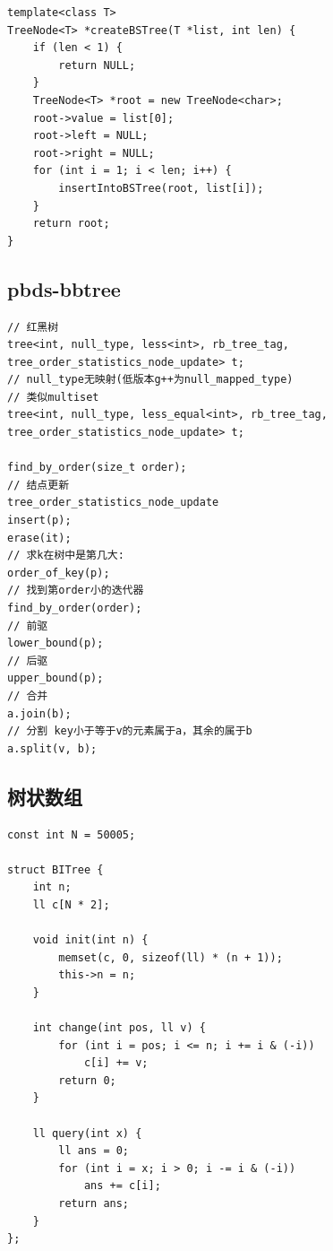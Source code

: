 \documentclass[twoside]{article}
\begin{document}
\begin{lstlisting}
template<class T>
TreeNode<T> *createBSTree(T *list, int len) {
    if (len < 1) {
        return NULL;
    }
    TreeNode<T> *root = new TreeNode<char>;
    root->value = list[0];
    root->left = NULL;
    root->right = NULL;
    for (int i = 1; i < len; i++) {
        insertIntoBSTree(root, list[i]);
    }
    return root;
}\end{lstlisting}
\subsection{pbds-bbtree}
\begin{lstlisting}
// 红黑树
tree<int, null_type, less<int>, rb_tree_tag, tree_order_statistics_node_update> t;
// null_type无映射(低版本g++为null_mapped_type)
// 类似multiset
tree<int, null_type, less_equal<int>, rb_tree_tag, tree_order_statistics_node_update> t;

find_by_order(size_t order);
// 结点更新
tree_order_statistics_node_update
insert(p);
erase(it);
// 求k在树中是第几大:
order_of_key(p);
// 找到第order小的迭代器
find_by_order(order);
// 前驱
lower_bound(p);
// 后驱
upper_bound(p);
// 合并
a.join(b);
// 分割 key小于等于v的元素属于a，其余的属于b
a.split(v, b);
\end{lstlisting}
\subsection{树状数组}
\begin{lstlisting}
const int N = 50005;

struct BITree {
    int n;
    ll c[N * 2];

    void init(int n) {
        memset(c, 0, sizeof(ll) * (n + 1));
        this->n = n;
    }

    int change(int pos, ll v) {
        for (int i = pos; i <= n; i += i & (-i)) 
            c[i] += v;
        return 0;
    }

    ll query(int x) {
        ll ans = 0;
        for (int i = x; i > 0; i -= i & (-i))
            ans += c[i];
        return ans;
    }
};\end{lstlisting}
\end{document}
